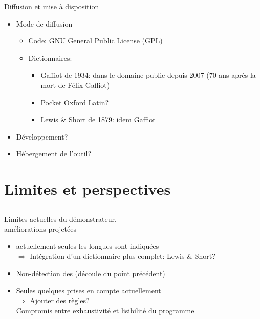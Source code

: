 \documentclass{beamer}
\begin{document}
\begin{frame}{Diffusion et mise à disposition}

\begin{itemize}
\item Mode de diffusion

\begin{itemize}
\item Code: GNU General Public License (GPL)
\item Dictionnaires:

\begin{itemize}
\item Gaffiot de 1934: dans le domaine public depuis 2007 (70 ans après la mort de Félix Gaffiot)
\item Pocket Oxford Latin?
\item Lewis \& Short de 1879: idem Gaffiot
\end{itemize}


\end{itemize}

\item Développement?

\item Hébergement de l'outil?

\end{itemize}
\end{frame} %



\section{Limites et perspectives}

\subsection*{}


\begin{frame}{Limites actuelles du démonstrateur, \\ améliorations projetées}

\begin{itemize}
\item {} actuellement seules les longues sont indiquées\\
$\Rightarrow$ Intégration d'un dictionnaire plus complet: Lewis \& Short?

\vfill

\item Non-détection des  {\small (découle du point précédent)}

\vfill

\item Seules quelques  prises en compte actuellement\\
$\Rightarrow$ Ajouter des règles?\\
\hfill Compromis entre exhaustivité et lisibilité du programme

\end{itemize}
\end{frame} %
\end{document}
